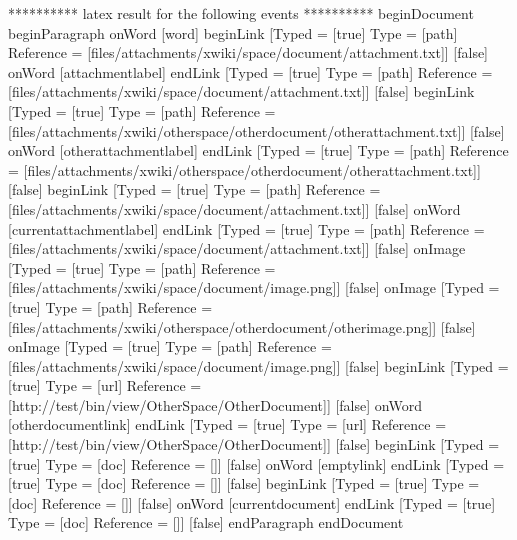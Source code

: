 ********** latex result for the following events **********
beginDocument
beginParagraph
onWord [word]
beginLink [Typed = [true] Type = [path] Reference = [files/attachments/xwiki/space/document/attachment.txt]] [false]
onWord [attachmentlabel]
endLink [Typed = [true] Type = [path] Reference = [files/attachments/xwiki/space/document/attachment.txt]] [false]
beginLink [Typed = [true] Type = [path] Reference = [files/attachments/xwiki/otherspace/otherdocument/otherattachment.txt]] [false]
onWord [otherattachmentlabel]
endLink [Typed = [true] Type = [path] Reference = [files/attachments/xwiki/otherspace/otherdocument/otherattachment.txt]] [false]
beginLink [Typed = [true] Type = [path] Reference = [files/attachments/xwiki/space/document/attachment.txt]] [false]
onWord [currentattachmentlabel]
endLink [Typed = [true] Type = [path] Reference = [files/attachments/xwiki/space/document/attachment.txt]] [false]
onImage [Typed = [true] Type = [path] Reference = [files/attachments/xwiki/space/document/image.png]] [false]
onImage [Typed = [true] Type = [path] Reference = [files/attachments/xwiki/otherspace/otherdocument/otherimage.png]] [false]
onImage [Typed = [true] Type = [path] Reference = [files/attachments/xwiki/space/document/image.png]] [false]
beginLink [Typed = [true] Type = [url] Reference = [http://test/bin/view/OtherSpace/OtherDocument]] [false]
onWord [otherdocumentlink]
endLink [Typed = [true] Type = [url] Reference = [http://test/bin/view/OtherSpace/OtherDocument]] [false]
beginLink [Typed = [true] Type = [doc] Reference = []] [false]
onWord [emptylink]
endLink [Typed = [true] Type = [doc] Reference = []] [false]
beginLink [Typed = [true] Type = [doc] Reference = []] [false]
onWord [currentdocument]
endLink [Typed = [true] Type = [doc] Reference = []] [false]
endParagraph
endDocument